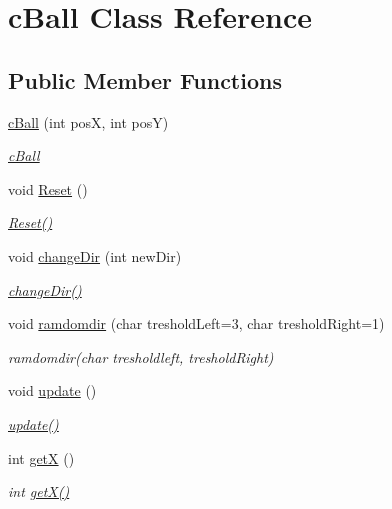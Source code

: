 \hypertarget{classc_ball}{}\section{c\+Ball Class Reference}
\label{classc_ball}
\subsection*{Public Member Functions}
\begin{DoxyCompactItemize}
\item 
\mbox{\hyperlink{classc_ball_a26865bcbfe3d50d5e938ec29eec791dd}{c\+Ball}} (int posX, int posY)
\begin{DoxyCompactList}\small\item\em \mbox{\hyperlink{classc_ball}{c\+Ball}} \end{DoxyCompactList}\item 
void \mbox{\hyperlink{classc_ball_a7c7b2cda898f6e1670faa2f753b9c420}{Reset}} ()
\begin{DoxyCompactList}\small\item\em \mbox{\hyperlink{classc_ball_a7c7b2cda898f6e1670faa2f753b9c420}{Reset()}} \end{DoxyCompactList}\item 
void \mbox{\hyperlink{classc_ball_a34a6133cf86c6a333ae9b14eef4d3f99}{change\+Dir}} (int new\+Dir)
\begin{DoxyCompactList}\small\item\em \mbox{\hyperlink{classc_ball_a34a6133cf86c6a333ae9b14eef4d3f99}{change\+Dir()}} \end{DoxyCompactList}\item 
void \mbox{\hyperlink{classc_ball_a65fd252361fa42fbe843a3cc73f2ebdb}{ramdomdir}} (char treshold\+Left=3, char treshold\+Right=1)
\begin{DoxyCompactList}\small\item\em ramdomdir(char tresholdleft, treshold\+Right) \end{DoxyCompactList}\item 
void \mbox{\hyperlink{classc_ball_acbdd0fa42ab6efd934d4966f3bf2e411}{update}} ()
\begin{DoxyCompactList}\small\item\em \mbox{\hyperlink{classc_ball_acbdd0fa42ab6efd934d4966f3bf2e411}{update()}} \end{DoxyCompactList}\item 
int \mbox{\hyperlink{classc_ball_a6216240ba8780e2510c2d2eb5c792be0}{getX}} ()
\begin{DoxyCompactList}\small\item\em int \mbox{\hyperlink{classc_ball_a6216240ba8780e2510c2d2eb5c792be0}{get\+X()}} \end{DoxyCompactList}\item 

\end{DoxyCompactItemize}
